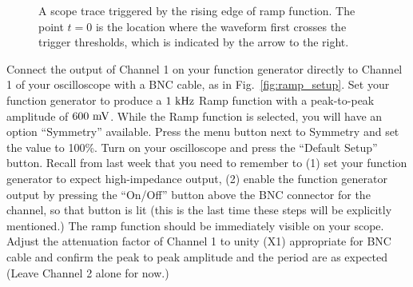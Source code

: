 \begin{figure}[htbp]
\begin{center}
\caption{A scope trace triggered by the rising edge of ramp function.  The point $t=0$ is the location where the waveform first crosses the trigger thresholds, which is indicated by the arrow to the right.}
\label{fig:trigger_ramp}
\end{center}
\end{figure}

Connect the output of Channel 1 on your function generator directly to
Channel 1 of your oscilloscope with a BNC cable, as in
Fig.~\ref{fig:ramp_setup}.  Set your function generator to produce a
$1~\rm kHz$ Ramp function with a peak-to-peak amplitude of $600~\rm
mV$. While the Ramp function is selected, you will have an option
``Symmetry'' available.  Press the menu button next to Symmetry and
set the value to 100\%.  Turn on your oscilloscope and press the
``Default Setup'' button.  Recall from last week that you need to
remember to (1) set your function generator to expect high-impedance
output, (2) enable the function generator output by pressing the
``On/Off'' button above the BNC connector for the channel, so that
button is lit (this is the last time these steps will be explicitly
mentioned.)  The ramp function should be immediately visible on your
scope.  Adjust the attenuation factor of Channel 1 to unity (X1)
appropriate for BNC cable and confirm the peak to peak amplitude and
the period are as expected (Leave Channel 2 alone for now.)

